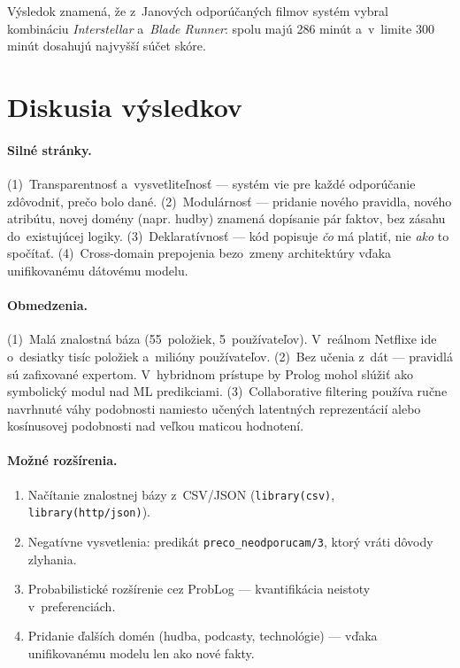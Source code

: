 \documentclass[11pt,a4paper]{article}
\begin{document}
\noindent
Výsledok znamená, že z~Janových odporúčaných filmov systém vybral
kombináciu \emph{Interstellar} a~\emph{Blade Runner}: spolu majú 286 minút
a~v~limite 300 minút dosahujú najvyšší súčet skóre.

\section{Diskusia výsledkov}

\paragraph{Silné stránky.} (1)~Transparentnosť a~vysvetliteľnosť ---
systém vie pre každé odporúčanie zdôvodniť, prečo bolo dané.
(2)~Modulárnosť --- pridanie nového pravidla, nového atribútu,
novej domény (napr. hudby) znamená dopísanie pár faktov, bez
zásahu do~existujúcej logiky. (3)~Deklaratívnosť --- kód
popisuje \emph{čo} má platiť, nie \emph{ako} to spočítať.
(4)~Cross-domain prepojenia bezo~zmeny architektúry vďaka
unifikovanému dátovému modelu.

\paragraph{Obmedzenia.} (1)~Malá znalostná báza
(55~položiek, 5~používateľov). V~reálnom Netflixe ide
o~desiatky tisíc položiek a~milióny používateľov.
(2)~Bez učenia z~dát --- pravidlá sú zafixované expertom.
V~hybridnom prístupe by Prolog mohol slúžiť ako symbolický
modul nad ML predikciami. (3)~Collaborative filtering používa
ručne navrhnuté váhy podobnosti namiesto učených latentných
reprezentácií alebo kosínusovej podobnosti nad veľkou maticou
hodnotení.

\paragraph{Možné rozšírenia.}
\begin{enumerate}[noitemsep]
  \item Načítanie znalostnej bázy z~CSV/JSON
        (\texttt{library(csv)}, \texttt{library(http/json)}).
  \item Negatívne vysvetlenia: predikát
        \texttt{preco\_neodporucam/3}, ktorý vráti dôvody zlyhania.
  \item Probabilistické rozšírenie cez ProbLog ---
        kvantifikácia neistoty v~preferenciách.
  \item Pridanie ďalších domén (hudba, podcasty, technológie)
        --- vďaka unifikovanému modelu len ako nové fakty.
\end{enumerate}
\end{document}
